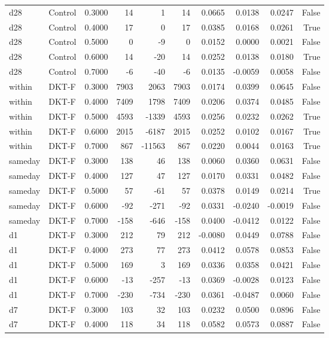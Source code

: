 \begin{tabular}{llrrrrrrrr}
d28 & Control & 0.3000 & 14 & 1 & 14 & 0.0665 & 0.0138 & 0.0247 & False \\
d28 & Control & 0.4000 & 17 & 0 & 17 & 0.0385 & 0.0168 & 0.0261 & True \\
d28 & Control & 0.5000 & 0 & -9 & 0 & 0.0152 & 0.0000 & 0.0021 & False \\
d28 & Control & 0.6000 & 14 & -20 & 14 & 0.0252 & 0.0138 & 0.0180 & True \\
d28 & Control & 0.7000 & -6 & -40 & -6 & 0.0135 & -0.0059 & 0.0058 & False \\
within & DKT-F & 0.3000 & 7903 & 2063 & 7903 & 0.0174 & 0.0399 & 0.0645 & False \\
within & DKT-F & 0.4000 & 7409 & 1798 & 7409 & 0.0206 & 0.0374 & 0.0485 & False \\
within & DKT-F & 0.5000 & 4593 & -1339 & 4593 & 0.0256 & 0.0232 & 0.0262 & True \\
within & DKT-F & 0.6000 & 2015 & -6187 & 2015 & 0.0252 & 0.0102 & 0.0167 & True \\
within & DKT-F & 0.7000 & 867 & -11563 & 867 & 0.0220 & 0.0044 & 0.0163 & True \\
sameday & DKT-F & 0.3000 & 138 & 46 & 138 & 0.0060 & 0.0360 & 0.0631 & False \\
sameday & DKT-F & 0.4000 & 127 & 47 & 127 & 0.0170 & 0.0331 & 0.0482 & False \\
sameday & DKT-F & 0.5000 & 57 & -61 & 57 & 0.0378 & 0.0149 & 0.0214 & True \\
sameday & DKT-F & 0.6000 & -92 & -271 & -92 & 0.0331 & -0.0240 & -0.0019 & False \\
sameday & DKT-F & 0.7000 & -158 & -646 & -158 & 0.0400 & -0.0412 & 0.0122 & False \\
d1 & DKT-F & 0.3000 & 212 & 79 & 212 & -0.0080 & 0.0449 & 0.0788 & False \\
d1 & DKT-F & 0.4000 & 273 & 77 & 273 & 0.0412 & 0.0578 & 0.0853 & False \\
d1 & DKT-F & 0.5000 & 169 & 3 & 169 & 0.0336 & 0.0358 & 0.0421 & False \\
d1 & DKT-F & 0.6000 & -13 & -257 & -13 & 0.0369 & -0.0028 & 0.0123 & False \\
d1 & DKT-F & 0.7000 & -230 & -734 & -230 & 0.0361 & -0.0487 & 0.0060 & False \\
d7 & DKT-F & 0.3000 & 103 & 32 & 103 & 0.0232 & 0.0500 & 0.0896 & False \\
d7 & DKT-F & 0.4000 & 118 & 34 & 118 & 0.0582 & 0.0573 & 0.0887 & False \\

\end{tabular}
